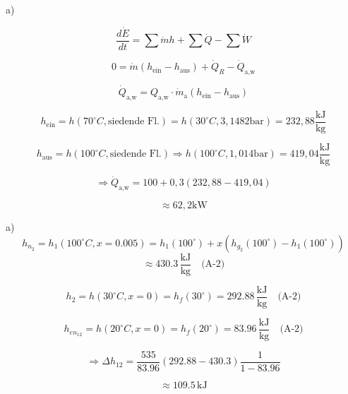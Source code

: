 a)

\[
\frac{d\dot{E}}{dt} = \sum \dot{m} h + \sum \dot{Q} - \sum \dot{W}
\]

\[
0 = \dot{m} (h_{\text{ein}} - h_{\text{aus}}) + \dot{Q}_R - \dot{Q}_{\text{a,w}}
\]

\[
\dot{Q}_{\text{a,w}} = Q_{\text{a,w}} \cdot \dot{m}_{\text{a}} (h_{\text{ein}} - h_{\text{aus}})
\]

\[
h_{\text{ein}} = h(70^\circ C, \text{siedende Fl.}) = h(30^\circ C, 3,1482 \text{bar}) = 232,88 \frac{\text{kJ}}{\text{kg}}
\]

\[
h_{\text{aus}} = h(100^\circ C, \text{siedende Fl.}) \Rightarrow h(100^\circ C, 1,014 \text{bar}) = 419,04 \frac{\text{kJ}}{\text{kg}}
\]

\[
\Rightarrow \dot{Q}_{\text{a,w}} = 100 + 0,3 (232,88 - 419,04)
\]

\[
\approx 62,2 \text{kW}
\]

a) 
\[
h_{n_2} = h_1(100^\circ C, x = 0.005) = h_1(100^\circ) + x \left( h_{g_2}(100^\circ) - h_1(100^\circ) \right)
\]
\[
\approx 430.3 \, \frac{\text{kJ}}{\text{kg}} \quad \text{(A-2)}
\]

\[
h_2 = h(30^\circ C, x = 0) = h_f(30^\circ) = 292.88 \, \frac{\text{kJ}}{\text{kg}} \quad \text{(A-2)}
\]

\[
h_{en_{12}} = h(20^\circ C, x = 0) = h_f(20^\circ) = 83.96 \, \frac{\text{kJ}}{\text{kg}} \quad \text{(A-2)}
\]

\[
\Rightarrow \Delta h_{12} = \frac{535}{83.96} \left( 292.88 - 430.3 \right) \frac{1}{1 - 83.96}
\]

\[
\approx 109.5 \, \text{kJ}
\]